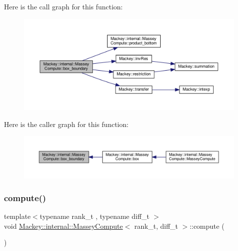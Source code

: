 Here is the call graph for this function\+:\nopagebreak
\begin{figure}[H]
\begin{center}
\leavevmode
\includegraphics[width=350pt]{structMackey_1_1internal_1_1MasseyCompute_aa62c7436a98f7be7105e6ab0157cb431_cgraph}
\end{center}
\end{figure}
Here is the caller graph for this function\+:\nopagebreak
\begin{figure}[H]
\begin{center}
\leavevmode
\includegraphics[width=350pt]{structMackey_1_1internal_1_1MasseyCompute_aa62c7436a98f7be7105e6ab0157cb431_icgraph}
\end{center}
\end{figure}
\mbox{\label{structMackey_1_1internal_1_1MasseyCompute_a0dc26be60def312ab591b72b1e24144f}} 
\subsubsection{\texorpdfstring{compute()}{compute()}}
{\footnotesize\ttfamily template$<$typename rank\+\_\+t , typename diff\+\_\+t $>$ \\
void \hyperlink{structMackey_1_1internal_1_1MasseyCompute}{Mackey\+::internal\+::\+Massey\+Compute}$<$ rank\+\_\+t, diff\+\_\+t $>$\+::compute (\begin{DoxyParamCaption}{ }\end{DoxyParamCaption})}

